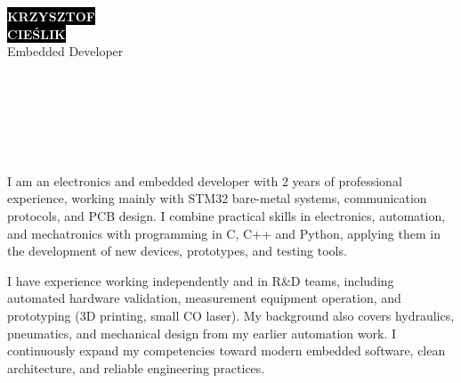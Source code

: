 \documentclass[9pt]{developercv}
\begin{document}

\begin{minipage}[t]{0.49\textwidth}
    \vspace{-\baselineskip}
    \colorbox{black}{{\HUGE\textcolor{white}{\textbf{KRZYSZTOF}}}}\\[0.5ex]
    \colorbox{black}{{\HUGE\textcolor{white}{\textbf{CIEŚLIK}}}}\\[1ex]
    {\huge Embedded Developer}\\
\end{minipage}%
\hfill
\begin{minipage}[t]{0.49\textwidth}
    \vspace{-\baselineskip}
    \\[1ex]
    \\[1ex]
    \\[1ex]
    \\[1ex]
    \\[1ex]
\end{minipage}


\noindent
I am an electronics and embedded developer with 2 years of professional experience, working mainly
with STM32 bare-metal systems, communication protocols, and PCB design. I combine practical skills in
electronics, automation, and mechatronics with programming in C, C++ and Python, applying them in the
development of new devices, prototypes, and testing tools.

\vspace{0.5ex}
\noindent
I have experience working independently and in R\&D teams, including automated hardware validation,
measurement equipment operation, and prototyping (3D printing, small CO laser). My background also
covers hydraulics, pneumatics, and mechanical design from my earlier automation work. I continuously
expand my competencies toward modern embedded software, clean architecture, and reliable engineering
practices.
\end{document}
